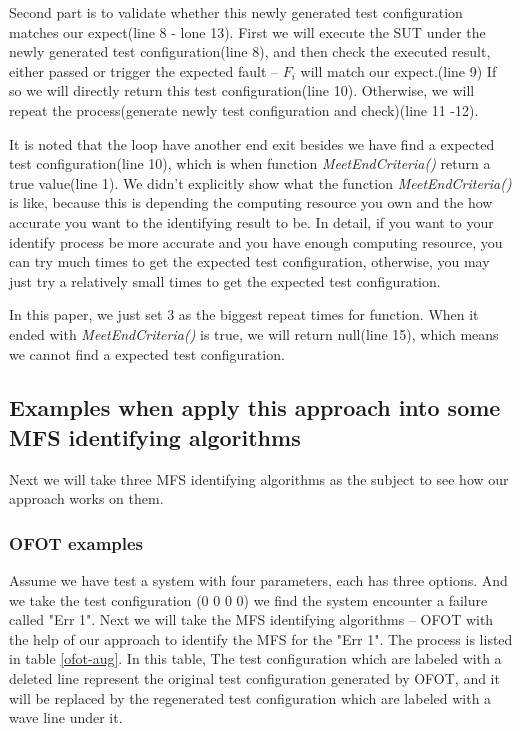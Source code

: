 \documentclass{sig-alternate}
\begin{document}
Second part is to validate whether this newly generated test configuration matches our expect(line 8 - lone 13). First we will execute the SUT under the newly generated test configuration(line 8), and then check the executed result, either passed or trigger the expected fault -- $F_{i}$ will match our expect.(line 9) If so we will directly return this test configuration(line 10). Otherwise, we will repeat the process(generate newly test configuration and check)(line 11 -12).

It is noted that the loop have another end exit besides we have find a expected test configuration(line 10), which is when function \emph{MeetEndCriteria()} return a true value(line 1). We didn't explicitly show what the function \emph{MeetEndCriteria()} is like, because this is depending the computing resource you own and the how accurate you want to the identifying result to be. In detail, if you want to your identify process be more accurate and you have enough computing resource, you can try much times to get the expected test configuration, otherwise, you may just try a relatively small times to get the expected test configuration.

In this paper, we just set 3 as the biggest repeat times for function. When it ended with \emph{MeetEndCriteria()} is true, we will return null(line 15), which means we cannot find a expected test configuration.

\subsection{Examples when apply this approach into some MFS identifying algorithms}
Next we will take three MFS identifying algorithms as the subject to see how our approach works on them.
\subsubsection{OFOT examples}
Assume we have test a system with four parameters, each has three options. And we take the test configuration (0 0 0 0) we find the system encounter a failure called "Err 1". Next we will take the MFS identifying algorithms -- OFOT with the help of our approach to identify the MFS for the "Err 1". The process is listed in table \ref{ofot-aug}. In this table, The test configuration which are labeled with a deleted line represent the original test configuration generated by OFOT, and it will be replaced by the regenerated test configuration which are labeled with a wave line under it.
\end{document}
